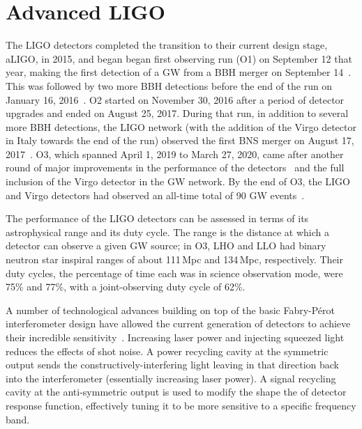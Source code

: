 \section{Advanced LIGO}

The LIGO detectors completed the transition to their current design stage, \ac{aLIGO}, in 2015, and began began first observing run (\acs{O1}) on September 12 that year, making the first detection of a \ac{GW} from a \ac{BBH} merger on September 14~\citep{gw150914}.
This was followed by two more \ac{BBH} detections before the end of the run on January 16, 2016~\citep{gwtc1}.
\Ac{O2} started on November 30, 2016 after a period of detector upgrades and ended on August 25, 2017.
During that run, in addition to several more \ac{BBH} detections, the \ac{LIGO} network (with the addition of the Virgo detector in Italy towards the end of the run) observed the first \ac{BNS} merger on August 17, 2017~\citep{gw170817}.
\Ac{O3}, which spanned April 1, 2019 to March 27, 2020, came after another round of major improvements in the performance of the detectors~\citep{Buikema_2020} and the full inclusion of the Virgo detector in the \ac{GW} network.
By the end of O3, the LIGO and Virgo detectors had observed an all-time total of 90 GW events~\citep{gwtc2,gwtc3}.

The performance of the LIGO detectors can be assessed in terms of its astrophysical range and its duty cycle.
The range is the distance at which a detector can observe a given GW source; in O3, LHO and LLO had binary neutron star inspiral ranges of about 111\,Mpc and 134\,Mpc, respectively.
Their duty cycles, the percentage of time each was in science observation mode, were 75\% and 77\%, with a joint-observing duty cycle of 62\%.

A number of technological advances building on top of the basic Fabry-P\'erot interferometer design have allowed the current generation of detectors to achieve their incredible sensitivity~\citep{aLIGO_design}.
Increasing laser power and injecting squeezed light reduces the effects of shot noise.
A power recycling cavity at the symmetric output sends the constructively-interfering light leaving in that direction back into the interferometer (essentially increasing laser power).
A signal recycling cavity at the anti-symmetric output is used to modify the shape the of detector response function, effectively tuning it to be more sensitive to a specific frequency band.

